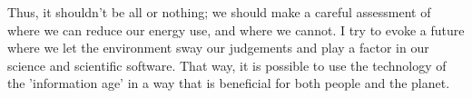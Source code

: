 \documentclass{article}
\begin{document}
Thus, it shouldn't be all or nothing; we should make a careful assessment of where we can reduce our energy use, and where we cannot. I try to evoke a future where we let the environment sway our judgements and play a factor in our science and scientific software. That way, it is possible to use the technology of the 'information age' in a way that is beneficial for both people and the planet.



\end{document}
